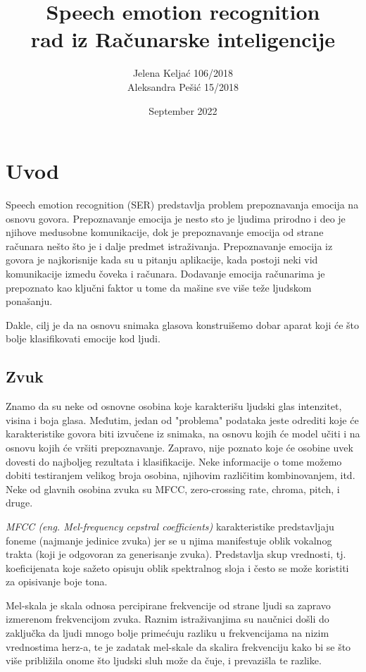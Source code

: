 \documentclass{article}
\title{Speech emotion recognition\\
    rad iz Računarske inteligencije}
\author{Jelena Keljać 106/2018\\
        Aleksandra Pešić 15/2018}
\date{September 2022}
\begin{document}

\maketitle
\newpage   

\renewcommand*\contentsname{Sadržaj}
\tableofcontents
\newpage

\section{Uvod}
Speech emotion recognition (SER) predstavlja problem prepoznavanja emocija na osnovu govora. Prepoznavanje emocija je nesto sto je ljudima prirodno i deo je njihove medusobne komunikacije, dok je prepoznavanje emocija od strane računara nešto što je i dalje predmet istraživanja. Prepoznavanje emocija iz govora je najkorisnije kada su u pitanju aplikacije, kada postoji neki vid komunikacije izmedu čoveka i računara. Dodavanje emocija računarima je prepoznato kao ključni faktor u tome da mašine sve više teže ljudskom ponašanju.

Dakle, cilj je da na osnovu snimaka glasova konstruišemo dobar aparat koji će što bolje klasifikovati emocije kod ljudi.

\subsection{Zvuk}
Znamo da su neke od osnovne osobina koje karakterišu ljudski glas intenzitet, visina i boja glasa.
Međutim, jedan od "problema" podataka jeste odrediti koje će karakteristike govora biti izvučene iz snimaka, na osnovu kojih će model učiti i na osnovu kojih će vršiti prepoznavanje. Zapravo, nije poznato koje će osobine uvek dovesti do najboljeg rezultata i klasifikacije. Neke informacije o tome možemo dobiti testiranjem velikog broja osobina, njihovim različitim kombinovanjem, itd. Neke od glavnih osobina zvuka su MFCC, zero-crossing rate, chroma, pitch, i druge. 

\textit{MFCC (eng. Mel-frequency cepstral coefficients)} karakteristike predstavljaju foneme (najmanje jedinice zvuka) jer se u njima manifestuje oblik vokalnog trakta (koji je odgovoran za generisanje zvuka). Predstavlja skup vrednosti, tj. koeficijenata koje sažeto opisuju oblik spektralnog sloja i često se može koristiti za opisivanje boje tona.


Mel-skala je skala odnosa percipirane frekvencije od strane ljudi sa zapravo izmerenom frekvencijom zvuka. Raznim istraživanjima su naučnici došli do zaključka da ljudi mnogo bolje primećuju razliku u frekvencijama na nizim vrednostima herz-a, te je zadatak mel-skale da skalira frekvenciju kako bi se što više približila onome što ljudski sluh može da čuje, i prevazišla te razlike.
\end{document}
